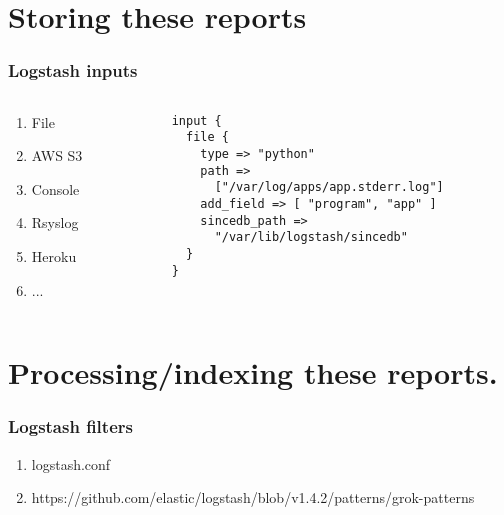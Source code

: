 \documentclass[13pt, ignorenonframetext]{beamer}
\begin{document}
\section{Storing these reports}
\begin{frame}[fragile]
\frametitle{Logstash inputs}
      \begin{columns}[c] %
     \begin{column}{2.3cm} %
\begin{enumerate}
\item File
\item AWS S3
\item Console
\item Rsyslog
\item Heroku
\item ...
\end{enumerate}
     \end{column}
     \begin{column}{6.7cm} %
\begin{lstlisting}[basicstyle=\footnotesize]
input {
  file {
    type => "python"
    path => 
      ["/var/log/apps/app.stderr.log"]
    add_field => [ "program", "app" ]
    sincedb_path => 
      "/var/lib/logstash/sincedb"
  }
}
\end{lstlisting}
     \end{column}
     \end{columns}

\end{frame}


\section{Processing/indexing these reports.}
\begin{frame}
\frametitle{Logstash filters}
\begin{enumerate}
\item logstash.conf
\item https://github.com/elastic/logstash/blob/v1.4.2/patterns/grok-patterns
\end{enumerate}
\end{frame}
\end{document}
